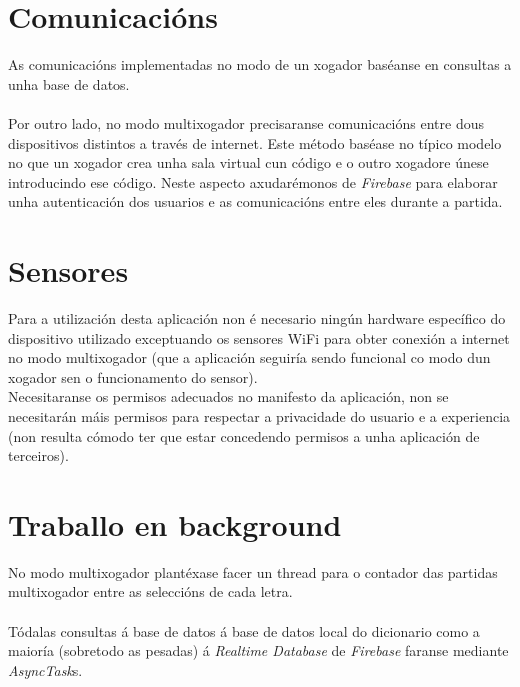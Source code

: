 \section {Comunicacións}
As comunicacións implementadas no modo de un xogador baséanse en consultas a unha base de datos. \cite{firebase-getvalue}  \cite{error-datasnapshot} \cite{firebase}\\
\\
Por outro lado, no modo multixogador precisaranse comunicacións entre dous dispositivos distintos a través de internet. Este método baséase no típico modelo no que un xogador crea unha sala virtual cun código e o outro xogadore únese introducindo ese código. Neste aspecto axudarémonos de \textit{Firebase} para elaborar unha autenticación dos usuarios e as comunicacións entre eles durante a partida. \cite{binder-proxy} 
\\ \section {Sensores}
Para a utilización desta aplicación non é necesario ningún hardware específico do dispositivo utilizado exceptuando os sensores WiFi para obter conexión a internet no modo multixogador (que a aplicación seguiría sendo funcional co modo dun xogador sen o funcionamento do sensor).\\
Necesitaranse os permisos adecuados no manifesto da aplicación, non se necesitarán máis permisos para respectar a privacidade do usuario e a experiencia (non resulta cómodo ter que estar concedendo permisos a unha aplicación de terceiros). 

\section {Traballo en background} 
No modo multixogador plantéxase facer un thread  para o contador das partidas multixogador entre as seleccións de cada letra. \\
\\
Tódalas consultas á base de datos á base de datos local do dicionario como a maioría (sobretodo as pesadas) á \textit{Realtime Database} de \textit{Firebase} faranse mediante \textit{AsyncTask}s.